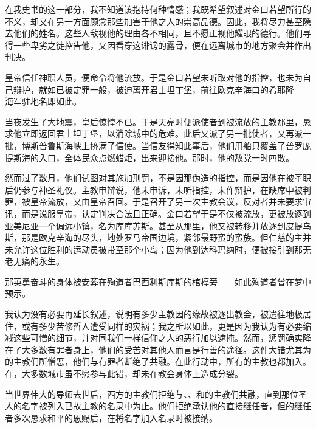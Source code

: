 在我史书的这一部分，我不知道该抱持何种情感；我既希望叙述对金口若望所行的不义，却又在另一方面顾念那些加害于他之人的崇高品德。因此，我将尽力甚至隐去他们的姓名。这些人敌视他的理由各不相同，且不愿正视他耀眼的德行。他们寻得一些卑劣之徒控告他，又因看穿这诽谤的露骨，便在远离城市的地方聚会并作出判决。\par

皇帝信任神职人员，便命令将他流放。于是金口若望未听取对他的指控，也未为自己辩护，就如已被定罪一般，被迫离开君士坦丁堡，前往欧克辛海口的希耶隆——海军驻地名即如此。\par

当夜发生了大地震，皇后惊惶不已。于是天亮时便派使者到被流放的主教那里，恳求他立即返回君士坦丁堡，以消除城中的危难。此后又派了另一批使者，又再派一批，博斯普鲁斯海峡上挤满了信使。当信友得知此事后，他们用船只覆盖了普罗庞提斯海的入口，全体民众点燃蜡炬，出来迎接他。那时，他的敌党一时四散。\par

然而过了数月，他们试图对其施加刑罚，不是因那伪造的指控，而是因他在被革职后仍参与神圣礼仪。主教申辩说，他未申诉，未听指控，未作辩护，在缺席中被判罪，被皇帝流放，又由皇帝召回。于是召开了另一次主教会议，反对者并未要求审讯，而是说服皇帝，认定判决合法且正确。金口若望于是不仅被流放，更被放逐到亚美尼亚一个偏远小镇，名为库库苏斯。甚至从那里，他又被转移并放逐到皮提乌斯，那是欧克辛海的尽头，地处罗马帝国边境，紧邻最野蛮的蛮族。但仁慈的主并未允许这位胜利的运动员被带至那个小岛；因为他到达科玛纳时，便被接引到那无老无痛的永生。\par

那英勇奋斗的身体被安葬在殉道者巴西利斯库斯的棺椁旁——如此殉道者曾在梦中预示。\par

我认为没有必要再延长叙述，说明有多少主教因的缘故被逐出教会，被遣往地极居住，或有多少苦修哲人遭受同样的灾祸；我之所以如此，更是因为我认为有必要缩减这些可憎的细节，并对同我们一样信仰之人的恶行加以遮掩。然而，惩罚确实降在了大多数有罪者身上，他们的受苦对其他人而言是行善的途径。这件大错尤其为的主教们所憎恶，他们与有罪者断绝了共融。在此行动中，所有的主教也都加入。在，大多数城市虽不愿参与此错，却未在教会身体上造成分裂。\par

当世界伟大的导师去世后，西方的主教们拒绝与、、和的主教们共融，直到那位圣人的名字被列入已故主教的名录中为止。他们拒绝承认他的直接继任者，但的继任者多次恳求和平的恩赐后，在将名字加入名录时被接纳。\par

